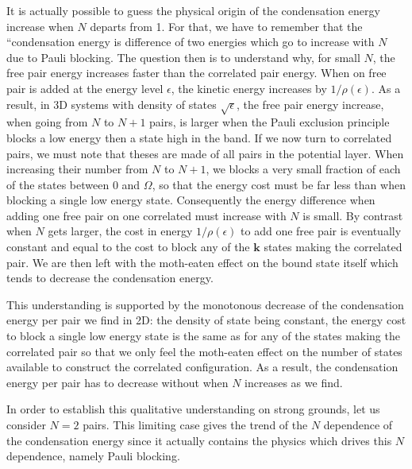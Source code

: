 \documentclass{article}
\newcommand{\vk}{\ensuremath{\mathbf{k}}}
\begin{document}
It is actually possible to guess the physical origin of the condensation energy increase when $N$ departs from 1.  For that, we have to remember that the ``condensation energy is difference of two energies which go to increase with $N$ due to Pauli blocking.  The question then is to understand why, for small $N$, the free pair energy increases faster than the correlated pair energy.  When on free pair is added at the energy level $\epsilon$, the kinetic energy increases by $1/\rho(\epsilon)$.  As a result, in 3D systems with density of states $\sqrt{\epsilon}$, the free pair energy increase, when going from $N$ to $N+1$ pairs, is larger when the Pauli exclusion principle blocks a low energy then a state high in the band.  If we now turn to correlated pairs, we must note that theses are made of all pairs in the potential layer. When increasing their number from $N$ to $N+1$, we blocks a very small fraction of each of the states between $0$ and $\Omega$, so that the energy cost must be far less than when blocking a single low energy state.  Consequently the energy difference when adding one free pair on one correlated must increase with $N$ is small. By contrast when $N$ gets larger, the cost in energy $1/\rho(\epsilon)$ to add one free pair is eventually constant and equal to the cost to block any of the $\vk$ states making the correlated pair.  We are then left with the moth-eaten effect on the bound state itself which tends to decrease the condensation energy. 

This understanding is supported by the monotonous decrease of the condensation energy per pair we find in 2D: the density of state being constant, the energy cost to block a single low energy state is the same as for any of the states making the correlated pair so that we only feel the moth-eaten effect on the number of states available to construct the correlated configuration.  As a result, the condensation energy per pair has to decrease without when $N$ increases as we find.  

In order to establish this qualitative understanding on strong grounds, let us consider $N=2$ pairs. This limiting case gives the trend of the $N$ dependence of the condensation energy since it actually contains the physics which drives this $N$ dependence, namely Pauli blocking.  
\end{document}

